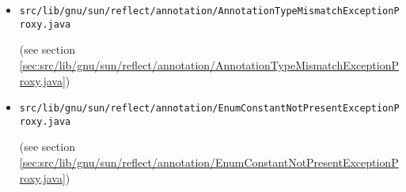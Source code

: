 \documentclass[a4paper, 10pt, titlepage]{scrartcl} %
\begin{document}
\begin{itemize}
 \item \begin{scriptsize}\verb|src|\hspace{0.0pt}\verb|/|\hspace{0.0pt}\verb|lib|\hspace{0.0pt}\verb|/|\hspace{0.0pt}\verb|gnu|\hspace{0.0pt}\verb|/|\hspace{0.0pt}\verb|sun|\hspace{0.0pt}\verb|/|\hspace{0.0pt}\verb|reflect|\hspace{0.0pt}\verb|/|\hspace{0.0pt}\verb|annotation|\hspace{0.0pt}\verb|/|\hspace{0.0pt}\verb|AnnotationTypeMismatchExceptionProxy|\hspace{0.0pt}\verb|.|\hspace{0.0pt}\verb|java|\end{scriptsize} (see section \ref{sec:src/lib/gnu/sun/reflect/annotation/AnnotationTypeMismatchExceptionProxy.java})
 \item \begin{scriptsize}\verb|src|\hspace{0.0pt}\verb|/|\hspace{0.0pt}\verb|lib|\hspace{0.0pt}\verb|/|\hspace{0.0pt}\verb|gnu|\hspace{0.0pt}\verb|/|\hspace{0.0pt}\verb|sun|\hspace{0.0pt}\verb|/|\hspace{0.0pt}\verb|reflect|\hspace{0.0pt}\verb|/|\hspace{0.0pt}\verb|annotation|\hspace{0.0pt}\verb|/|\hspace{0.0pt}\verb|EnumConstantNotPresentExceptionProxy|\hspace{0.0pt}\verb|.|\hspace{0.0pt}\verb|java|\end{scriptsize} (see section \ref{sec:src/lib/gnu/sun/reflect/annotation/EnumConstantNotPresentExceptionProxy.java})

\end{itemize}
\end{document}
